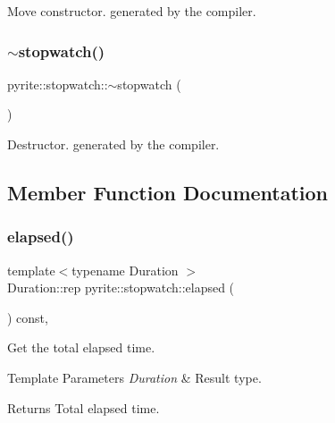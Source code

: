 Move constructor. generated by the compiler. \mbox{\label{classpyrite_1_1stopwatch_a6371ecaf8fe6d96fa39e477e3a82e7fc}} 
\subsubsection{\texorpdfstring{$\sim$stopwatch()}{~stopwatch()}}
{\footnotesize\ttfamily pyrite\+::stopwatch\+::$\sim$stopwatch (\begin{DoxyParamCaption}{ }\end{DoxyParamCaption})\hspace{0.3cm}{\ttfamily [default]}}

Destructor. generated by the compiler. 

\subsection{Member Function Documentation}
\mbox{\label{classpyrite_1_1stopwatch_a8032beb577019ab16594273aaaa97eb0}} 
\subsubsection{\texorpdfstring{elapsed()}{elapsed()}}
{\footnotesize\ttfamily template$<$typename Duration $>$ \\
Duration\+::rep pyrite\+::stopwatch\+::elapsed (\begin{DoxyParamCaption}{ }\end{DoxyParamCaption}) const\hspace{0.3cm}{\ttfamily [inline]}, {\ttfamily [noexcept]}}

Get the total elapsed time. 
\begin{DoxyTemplParams}{Template Parameters}
{\em Duration} & Result type. \\
\hline
\end{DoxyTemplParams}
\begin{DoxyReturn}{Returns}
Total elapsed time. 
\end{DoxyReturn}
\mbox{\label{classpyrite_1_1stopwatch_a4d5006e83d13f28295756506415aeb15}} 
